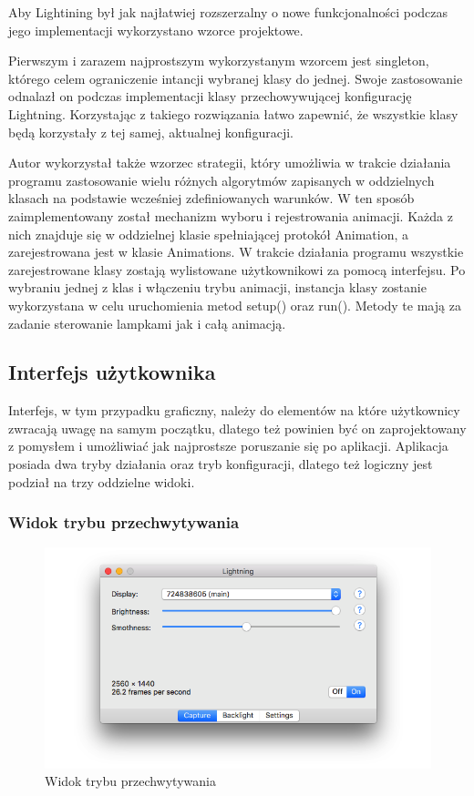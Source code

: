\documentclass[12pt]{report}
\begin{document}
Aby Lightining był jak najłatwiej rozszerzalny o nowe funkcjonalności podczas jego implementacji wykorzystano wzorce projektowe.

Pierwszym i zarazem najprostszym wykorzystanym wzorcem jest singleton, którego celem ograniczenie intancji wybranej klasy do jednej. Swoje zastosowanie odnalazł on podczas implementacji klasy przechowywującej konfigurację Lightning. Korzystając z takiego rozwiązania łatwo zapewnić, że wszystkie klasy będą korzystały z tej samej, aktualnej konfiguracji.

Autor wykorzystał także wzorzec strategii, który umożliwia w trakcie działania programu zastosowanie wielu różnych algorytmów zapisanych w oddzielnych klasach na podstawie wcześniej zdefiniowanych warunków. W ten sposób zaimplementowany został mechanizm wyboru i rejestrowania animacji. Każda z nich znajduje się w oddzielnej klasie spełniającej protokół Animation, a zarejestrowana jest w klasie Animations. W trakcie działania programu wszystkie zarejestrowane klasy zostają wylistowane użytkownikowi za pomocą interfejsu. Po wybraniu jednej z klas i włączeniu trybu animacji, instancja klasy zostanie wykorzystana w celu uruchomienia metod setup() oraz run(). Metody te mają za zadanie sterowanie lampkami jak i całą animacją.

\subsection{Interfejs użytkownika}

Interfejs, w tym przypadku graficzny, należy do elementów na które użytkownicy zwracają uwagę na samym początku, dlatego też powinien być on zaprojektowany z pomysłem i umożliwiać jak najprostsze poruszanie się po aplikacji. Aplikacja posiada dwa tryby działania oraz tryb konfiguracji, dlatego też logiczny jest podział na trzy oddzielne widoki.

\newpage

\subsubsection{Widok trybu przechwytywania}

\begin{figure}[h!]
\centering
\includegraphics[width=\textwidth]{../resources/capture.png}
\caption{Widok trybu przechwytywania}
\end{figure}
\end{document}
